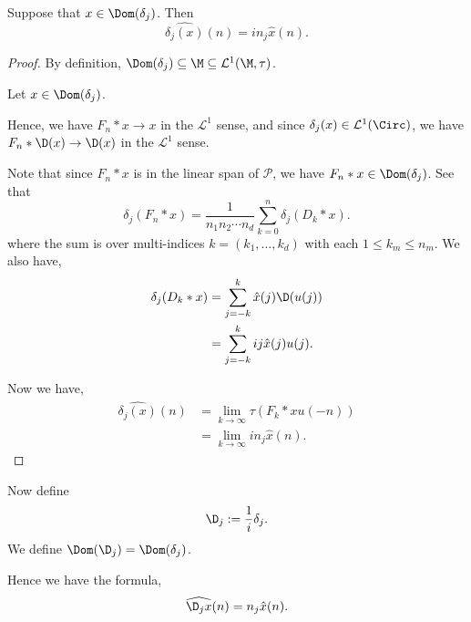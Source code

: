 \begin{proposition}
    Suppose that $x \in \Dom(\delta_j)$. Then 
    \begin{equation}
        \widehat{\delta_j(x)}(n) = in_j\widehat{x}(n).
    \end{equation}
\end{proposition}
\begin{proof}
    By definition, $\Dom(\delta_j) \subseteq \M \subseteq \mathcal{L}^1(\M,\tau)$. 
    
    Let $x \in \Dom(\delta_j)$.
    
    Hence, we have $F_n*x\rightarrow x$ in the $\mathcal{L}^1$ sense, and since $\delta_j(x) \in \mathcal{L}^1(\Circ)$, we have $F_n*\D(x)\rightarrow \D(x)$ in the $\mathcal{L}^1$ sense. 
    
    Note that since $F_n*x$ is in the linear span of $\mathcal{P}$, we
    have $F_n*x \in \Dom(\delta_j)$. See that
    \begin{equation}
        \delta_j(F_n *x) = \frac{1}{n_1n_2\cdots n_d}\sum_{k=0}^n \delta_j(D_k* x).
    \end{equation}
    where the sum is over multi-indices $k = (k_1,\ldots,k_d)$ with each $1\leq k_m \leq n_m$.
    We also have,
    \begin{align}
        \delta_j(D_k* x) &= \sum_{j=-k}^k \hat{x}(j)\D(u(j))\\
        &= \sum_{j=-k}^k ij\hat{x}(j)u(j).        
    \end{align}
    
    Now we have,
    \begin{align}
        \widehat{\delta_j(x)}(n) &= \lim_{k\rightarrow\infty} \tau(F_k*xu(-n))\\
                           &= \lim_{k\rightarrow\infty} in_j\hat{x}(n).
    \end{align} 
    
    
\end{proof}


Now define 
\begin{equation}
    \D_j := \frac{1}{i} \delta_j.
\end{equation}
We define $\Dom(\D_j) = \Dom(\delta_j)$.

Hence we have the formula,
\begin{equation}
    \widehat{\D_j x}(n) = n_j\hat{x}(n).
\end{equation}

